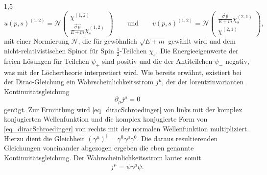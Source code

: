 \documentclass[11pt,a4paper,twoside]{report}
\begin{document}
\begin{spacing}{1,5}
\begin{equation}
 u(p,s)^{(1,2)} = \mathcal{N} \begin{pmatrix}
                          \chi^{(1,2)}\\
                          \frac{\vec \sigma \vec p}{E+m} \chi_s^{(1,2)}
                         \end{pmatrix} \qquad \text{und}\qquad v(p,s)^{(1,2)} = \mathcal{N} \begin{pmatrix}
                          \frac{\vec \sigma \vec p}{E+m} \chi_s^{(2,1)}\\
                          \chi^{(2,1)}                          
                         \end{pmatrix},
\end{equation}
mit einer Normierung $\mathcal{N}$, die für gewöhnlich $\sqrt{E + m}$ gewählt wird und dem nicht-relativistischen Spinor für Spin $\frac12$-Teilchen $\chi_s$.
Die Energieeigenwerte der freien Lösungen für Teilchen $\psi_+$ sind positiv und die der Antiteilchen $\psi_-$ negativ, was mit der Löchertheorie interpretiert
wird. Wie bereits erwähnt, existiert bei der Dirac-Gleichung ein Wahrscheinlichkeitsstrom $j^\mu$, der der lorentzinvarianten Kontinuitätsgleichung
\begin{equation}
 \partial_\mu j^\mu = 0
\end{equation}
genügt. Zur Ermittlung wird \eqref{eq_diracSchroedinger} von links mit der komplex konjugierten Wellenfunktion und die komplex konjugierte
Form von \eqref{eq_diracSchroedinger} von rechts mit der normalen Wellenfunktion multipliziert. Hierzu dient die Gleichheit 
$(\gamma^\mu)^\dagger = \gamma^0\gamma^\mu\gamma^0$. Die daraus resultierenden Gleichungen voneinander abgezogen ergeben die eben genannte Kontinuitätsgleichung.
Der Wahrscheinlichkeitsstrom lautet somit
\begin{equation}
 j^\mu = \bar \psi \gamma^\mu \psi.
 \label{eq_diracstrom}
\end{equation}



\end{spacing}
\end{document}
